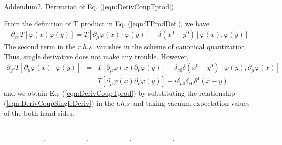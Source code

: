{\vspace{7mm}
\begin{center}
Addendum2. Derivation of Eq. (\ref{eqn:DerivCoupTprod})
\end{center}
From the definition of T product in Eq. (\ref{eqn:TProdDef}), we have
\begin{eqnarray}
\partial_{x^\mu} T[\varphi(x) \varphi(y)]
=
T[\partial_{\mu} \varphi(x) \cdot \varphi(y)]
+
\delta(x^0 - y^0) [\varphi(x), \varphi(y)]
\label{eqn:DerivCoupSingleDeriv}
\end{eqnarray}
The second term in the $r.h.s.$ vanishes in the scheme of canonical quantization.
Thus, single derivative does not make any trouble. However,
\begin{eqnarray}
\partial_{y^\nu} T[\partial_{\mu} \varphi(x) \cdot \varphi(y)]
&=&
T[\partial_{\mu} \varphi(x)  \partial_{\nu} \varphi(y)]
+
\delta_{\nu 0} \delta(x^0 - y^0) [\varphi(y), \partial_{\mu} \varphi(x)]
\nonumber\\
&=&
T[\partial_{\mu} \varphi(x)  \partial_{\nu} \varphi(y)]
+
i \delta_{\mu 0}\delta_{\nu 0} \delta^4(x - y) 
\end{eqnarray}
and we obtain Eq. (\ref{eqn:DerivCoupTprod})
by substituting the relationship (\ref{eqn:DerivCoupSingleDeriv})
in the $l.h.s$ and
taking vacuum expectation values of the both hand sides.
} %
\\
\verb/-----------.-----------.-----------.-----------.-----------/\\

\bigskip


